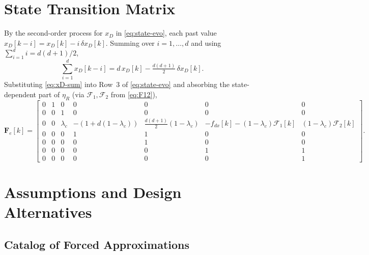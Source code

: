 \documentclass[11pt,a4paper]{ctexart}
\newcommand{\lc}{\lambda_c}
\newcommand{\fdx}{f_{dx}}
\newcommand{\xD}{x_D}
\newcommand{\dxD}{\delta x_D}
\newcommand{\Fe}{\mathbf{F}_e}
\newcommand{\etaR}{\eta_{R}}
\begin{document}
\section{State Transition Matrix}
\label{sec:Fe}

By the second-order process for $\xD$ in \eqref{eq:state-evo}, each past value $\xD[k{-}i] = \xD[k] - i\,\dxD[k]$. Summing over $i = 1, \dots, d$ and using $\sum_{i=1}^{d} i = d(d{+}1)/2$,
\begin{equation}
\sum_{i=1}^{d}\xD[k{-}i] = d\,\xD[k] - \tfrac{d(d{+}1)}{2}\,\dxD[k].
\label{eq:xD-sum}
\end{equation}
Substituting \eqref{eq:xD-sum} into Row~3 of \eqref{eq:state-evo} and absorbing the state-dependent part of $\etaR$ (via $\mathcal{F}_1,\mathcal{F}_2$ from \eqref{eq:F12}),
\begin{equation}
\Fe[k] = \begin{bmatrix}
0 & 1 & 0 & 0 & 0 & 0 & 0 \\
0 & 0 & 1 & 0 & 0 & 0 & 0 \\
0 & 0 & \lc & -(1{+}d(1{-}\lc)) & \tfrac{d(d{+}1)}{2}(1{-}\lc) & -\fdx[k]-(1{-}\lc)\mathcal{F}_1[k] & (1{-}\lc)\mathcal{F}_2[k] \\
0 & 0 & 0 & 1 & 1 & 0 & 0 \\
0 & 0 & 0 & 0 & 1 & 0 & 0 \\
0 & 0 & 0 & 0 & 0 & 1 & 1 \\
0 & 0 & 0 & 0 & 0 & 0 & 1
\end{bmatrix}.
\label{eq:Fe}
\end{equation}

\appendix
\newpage
\section{Assumptions and Design Alternatives}
\label{app:assumptions}

\subsection{Catalog of Forced Approximations}
\label{app:catalog}
\end{document}
